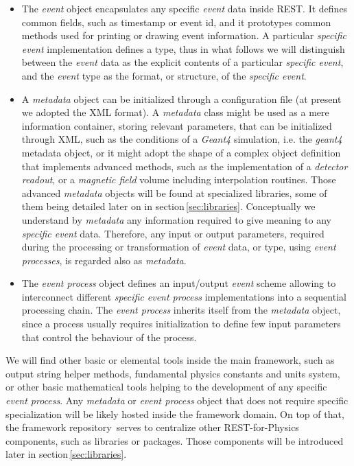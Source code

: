 \begin{itemize}
    \item The \emph{event} object encapsulates any specific \emph{event} data inside REST. It defines common fields, such as timestamp or event id, and it prototypes common methods used for printing or drawing event information. A particular \emph{specific event} implementation defines a type, thus in what follows we will distinguish between the \emph{event} data as the explicit contents of a particular \emph{specific event}, and the \emph{event} type as the format, or structure, of the \emph{specific event}.
    
    \item A \emph{metadata} object can be initialized through a configuration file (at present we adopted the XML format). A \emph{metadata} class might be used as a mere information container, storing relevant parameters, that can be initialized through XML, such as the conditions of a \emph{Geant4} simulation, i.e. the \emph{geant4} metadata object, or it might adopt the shape of a complex object definition that implements advanced methods, such as the implementation of a \emph{detector readout}, or a \emph{magnetic field} volume including interpolation routines. Those advanced \emph{metadata} objects will be found at specialized libraries, some of them being detailed later on in section\,\ref{sec:libraries}. Conceptually we understand by \emph{metadata} any information required to give meaning to any \emph{specific event} data. Therefore, any input or output parameters, required during the processing or transformation of \emph{event} data, or type, using \emph{event processes}, is regarded also as \emph{metadata}. 
    
    \item The \emph{event process} object defines an input/output \emph{event} scheme allowing to interconnect different \emph{specific event process} implementations into a sequential processing chain. The \emph{event process} inherits itself from the \emph{metadata} object, since a process usually requires initialization to define few input parameters that control the behaviour of the process.
\end{itemize}

We will find other basic or elemental tools inside the main framework, such as output string helper methods, fundamental physics constants and units system, or other basic mathematical tools helping to the development of any specific \emph{event process}. Any \emph{metadata} or \emph{event process} object that does not require specific specialization will be likely hosted inside the framework domain.
 On top of that, the framework repository\,\cite{REST_Framework_Git} serves to centralize other REST-for-Physics components, such as libraries or packages. Those components will be introduced later in section\,\ref{sec:libraries}.%

